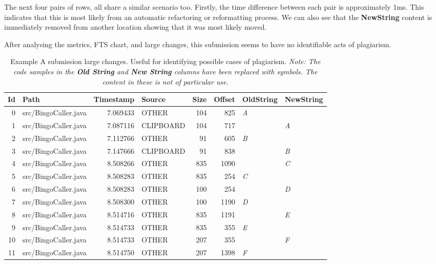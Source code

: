 The next four pairs of rows, all share a similar scenario too. Firstly, the time difference between each pair is approximately 1ms. This indicates that this is most likely from an automatic refactoring or reformatting process. We can also see that the \textbf{NewString} content is immediately removed from another location showing that it was most likely moved.

After analysing the metrics, FTS chart, and large changes, this submission seems to have no identifiable acts of plagiarism.

\begin{table}[H]
\begin{center}
\begin{tabular}{|r|l|r|l|r|r|l|l|}
\hline
\textbf{Id} & \textbf{Path} & \multicolumn{1}{l|}{\textbf{Timestamp}} & \textbf{Source} & \multicolumn{1}{l|}{\textbf{Size}} & \multicolumn{1}{l|}{\textbf{Offset}} & \textbf{OldString} & \textbf{NewString} \\ \hline
0 & src/BingoCaller.java & 7.069433 & OTHER & 104 & 825 & \textit{A} &  \\ \hline
1 & src/BingoCaller.java & 7.087116 & CLIPBOARD & 104 & 717 &  & \textit{A} \\ \hline
2 & src/BingoCaller.java & 7.112766 & OTHER & 91 & 605 & \textit{B} &  \\ \hline
3 & src/BingoCaller.java & 7.147666 & CLIPBOARD & 91 & 838 &  & \textit{B} \\ \hline
4 & src/BingoCaller.java & 8.508266 & OTHER & 835 & 1090 &  & \textit{C} \\ \hline
5 & src/BingoCaller.java & 8.508283 & OTHER & 835 & 254 & \textit{C} &  \\ \hline
6 & src/BingoCaller.java & 8.508283 & OTHER & 100 & 254 &  & \textit{D} \\ \hline
7 & src/BingoCaller.java & 8.508300 & OTHER & 100 & 1190 & \textit{D} &  \\ \hline
8 & src/BingoCaller.java & 8.514716 & OTHER & 835 & 1191 &  & \textit{E} \\ \hline
9 & src/BingoCaller.java & 8.514733 & OTHER & 835 & 355 & \textit{E} &  \\ \hline
10 & src/BingoCaller.java & 8.514733 & OTHER & 207 & 355 &  & \textit{F} \\ \hline
11 & src/BingoCaller.java & 8.514750 & OTHER & 207 & 1398 & \textit{F} &  \\ \hline
\end{tabular}
\end{center}
\caption[Submission Results A Changes]{Example A submission large changes. Useful for identifying possible cases of plagiarism. \textit{Note: The code samples in the \textbf{Old String} and \textbf{New String} columns have been replaced with symbols. The content in these is not of particular use.}}
\label{tbl:results-a-submission-changes}
\end{table}

